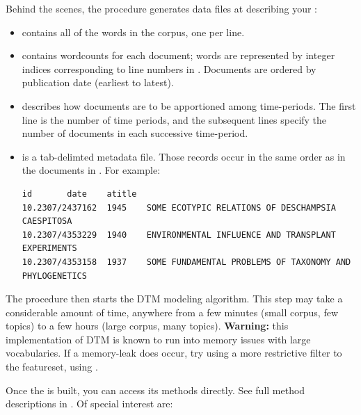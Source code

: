 \documentclass[letterpaper,10pt,english]{sphinxmanual}
\begin{document}
\begin{fulllineitems}
Behind the scenes, the  procedure generates data files at
 describing your {\hyperref[tethne.classes.corpus:tethne.classes.corpus.Corpus]{}}:
\begin{itemize}
\item {} 
 contains all of the words in the corpus, one per
line.

\item {} 
 contains wordcounts for each document; words are
represented by integer indices corresponding to line numbers in 
. Documents are ordered by publication date (earliest
to latest).

\item {} 
 describes how documents are to be apportioned among
time-periods. The first line is the number of time periods, and the 
subsequent lines specify the number of documents in each successive
time-period.

\item {} 
 is a tab-delimted metadata file. Those records occur 
in the same order as in the documents in . For
example:

\begin{Verbatim}[commandchars=\\\{\}]
id       date    atitle
10.2307/2437162  1945    SOME ECOTYPIC RELATIONS OF DESCHAMPSIA CAESPITOSA
10.2307/4353229  1940    ENVIRONMENTAL INFLUENCE AND TRANSPLANT EXPERIMENTS
10.2307/4353158  1937    SOME FUNDAMENTAL PROBLEMS OF TAXONOMY AND PHYLOGENETICS
\end{Verbatim}

\end{itemize}

The  procedure then starts the DTM modeling algorithm. This 
step may take a considerable amount of time, anywhere from a few minutes 
(small corpus, few topics) to a few hours (large corpus, many topics).
\textbf{Warning:} this implementation of DTM is known to run into memory issues
with large vocabularies. If a memory-leak does occur, try using a more
restrictive filter to the featureset, using 
.

Once the {\hyperref[tethne.model.corpus.dtmmodel:tethne.model.corpus.dtmmodel.DTMModel]{}} is built, you can access its methods directly.
See full method descriptions in {\hyperref[tethne.model.corpus.dtmmodel:tethne.model.corpus.dtmmodel.DTMModel]{}}. Of special interest 
are:


\end{fulllineitems}
\end{document}

